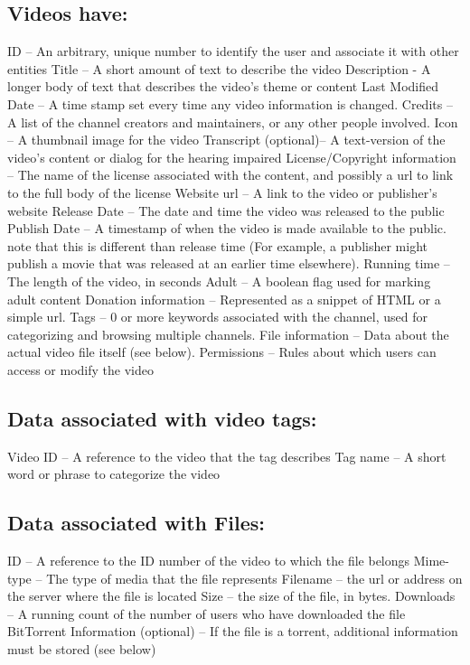 \documentclass[a4paper,12pt]{report}
\begin{document}
\subsection{Videos have:}
	ID – An arbitrary, unique number to identify the user and associate it with other 		entities 
	Title – A short amount of text to describe the video
Description - A longer body of text that describes the video's theme or content
	Last Modified Date – A time stamp set every time any video information is 		changed.
	Credits – A list of the channel creators and maintainers, or any other people 		involved. 
	Icon – A thumbnail image for the video
	Transcript (optional)– A text-version of the video's content or dialog for the 		hearing impaired
	License/Copyright information – The name of the license associated with the 	content, and possibly a url to link to the full body of the license
	Website url – A link to the video  or publisher's website
	Release Date – The date and time the video was released to the public
Publish Date – A timestamp of when the video is made available to the public. 		note that this is different than release time (For example, a publisher might 		publish a movie that was released at an earlier time elsewhere).
	Running time – The length of the video, in seconds
	Adult – A boolean flag used for marking adult content
	Donation information – Represented as a snippet of HTML or a simple url.
Tags – 0 or more keywords associated with the channel, used for categorizing and 	browsing multiple channels.
File information – Data about the actual video file itself (see below).
	Permissions – Rules about which users can access or modify the video

\subsection{Data associated with video tags:}
	Video ID – A reference to the video that the tag describes
	Tag name – A short word or phrase to categorize the video

\subsection{Data associated with Files:}
	ID – A reference to the ID number of the video to which the file belongs
	Mime-type – The type of media that the file represents
	Filename – the url or address on the server where the file is located
	Size – the size of the file, in bytes.
	Downloads – A running count of the number of users who have downloaded the 		file
	BitTorrent Information (optional) – If the file is a torrent, additional information 		must be stored (see below)
\end{document}
